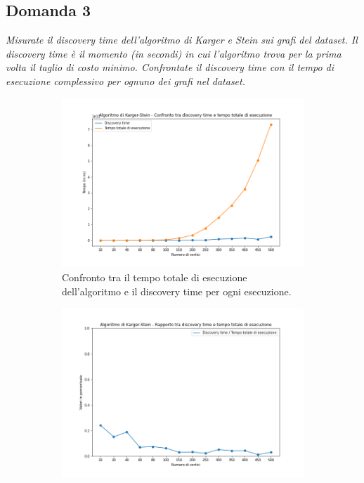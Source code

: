 \subsection{Domanda 3}
\textit{Misurate il discovery time dell'algoritmo di Karger e Stein sui grafi del dataset. Il discovery time è il momento (in secondi) in cui l'algoritmo trova per la prima volta il taglio di costo minimo.  Confrontate il discovery time con il tempo di esecuzione complessivo per ognuno dei grafi nel dataset.}

\begin{figure}[H]
	\begin{subfigure}{.49\textwidth}
		\centering
		\includegraphics[width=1\textwidth]{res/images/single/karger-stein/discovery-time/karger_stein_confronto_discovery_time_total_time.png}
		\caption{Confronto tra il tempo totale di esecuzione dell'algoritmo e il discovery time per ogni esecuzione.}
		\label{fig:karger_stein_confronto_discovery_time_total_time}
	\end{subfigure}
	\begin{subfigure}{.49\textwidth}
		\centering
		\includegraphics[width=1\textwidth]{res/images/single/karger-stein/discovery-time/karger_stein_rapporto_discovery_time_total_time.png}

\end{subfigure}
\end{figure}
